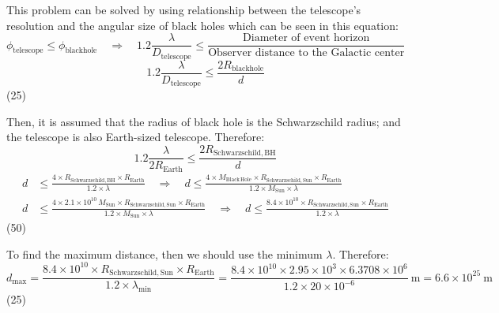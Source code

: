 This problem can be solved by using relationship between the telescope's
resolution and the angular size of black holes which can be seen in this
equation:
\[
\phi_{\mathrm{telescope}} \leq \phi_{\mathrm{blackhole}}
\quad\Rightarrow\quad
1.2\frac{\lambda}{D_{\mathrm{telescope}}}
 \leq \frac{\text{Diameter of event horizon}}
           {\text{Observer distance to the Galactic center}}
\]
\[
1.2\frac{\lambda}{D_{\mathrm{telescope}}}
 \leq \frac{2R_{\mathrm{blackhole}}}{d}
\]
\hfill(25)

Then, it is assumed that the radius of black hole is the Schwarzschild
radius; and the telescope is also Earth-sized telescope. Therefore:
\[
1.2\frac{\lambda}{2R_{\mathrm{Earth}}}
 \leq \frac{2R_{\mathrm{Schwarzschild,BH}}}{d}
\]
\begin{align*}
d &\leq \frac{4 \times R_{\mathrm{Schwarzschild,BH}} \times R_{\mathrm{Earth}}}
             {1.2 \times \lambda}
\quad\Rightarrow\quad
d \leq \frac{4 \times M_{\mathrm{Black\,Hole}}
             \times R_{\mathrm{Schwarzschild,Sun}} \times R_{\mathrm{Earth}}}
            {1.2 \times M_{\mathrm{Sun}} \times \lambda}\\
d &\leq \frac{4 \times 2.1 \times 10^{10}\,M_{\mathrm{Sun}}
             \times R_{\mathrm{Schwarzschild,Sun}} \times R_{\mathrm{Earth}}}
            {1.2 \times M_{\mathrm{Sun}} \times \lambda}
\quad\Rightarrow\quad
d \leq \frac{8.4 \times 10^{10}
             \times R_{\mathrm{Schwarzschild,Sun}} \times R_{\mathrm{Earth}}}
            {1.2 \times \lambda}
\end{align*}
\hfill(50)

To find the maximum distance, then we should use the minimum $\lambda$.
Therefore:
\[
d_{\max} = \frac{8.4 \times 10^{10}
            \times R_{\mathrm{Schwarzschild,Sun}} \times R_{\mathrm{Earth}}}
           {1.2 \times \lambda_{\min}}
 = \frac{8.4 \times 10^{10} \times 2.95 \times 10^{3}
         \times 6.3708 \times 10^{6}}
        {1.2 \times 20 \times 10^{-6}}\ \mathrm{m}
 = 6.6 \times 10^{25}\ \mathrm{m}
\]
\hfill(25)
